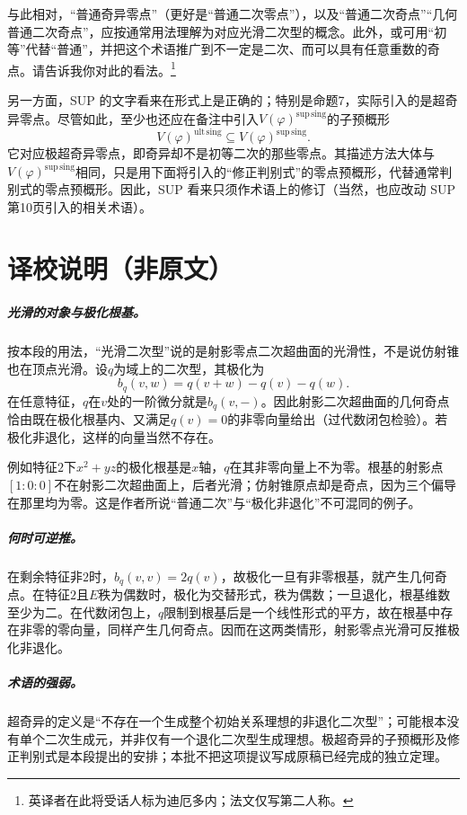 \documentclass[openany,fontset=fandol]{ctexbook}
\begin{document}
与此相对，“普通奇异零点”（更好是“普通二次零点”），以及“普通二次奇点”“几何普通二次奇点”，应按通常用法理解为对应光滑二次型的概念。此外，或可用“初等”代替“普通”，并把这个术语推广到不一定是二次、而可以具有任意重数的奇点。请告诉我你对此的看法。\footnote{英译者在此将受话人标为迪厄多内；法文仅写第二人称。}

另一方面，SUP 的文字看来在形式上是正确的；特别是命题7，实际引入的是超奇异零点。尽管如此，至少也还应在备注中引入$V(\varphi)^{\mathrm{sup\,sing}}$的子预概形
\[
V(\varphi)^{\mathrm{ult\,sing}}
\subseteq V(\varphi)^{\mathrm{sup\,sing}}.
\]
它对应极超奇异零点，即奇异却不是初等二次的那些零点。其描述方法大体与$V(\varphi)^{\mathrm{sup\,sing}}$相同，只是用下面将引入的“修正判别式”的零点预概形，代替通常判别式的零点预概形。因此，SUP 看来只须作术语上的修订（当然，也应改动 SUP 第10页引入的相关术语）。
\chapter*{译校说明（非原文）}
\paragraph{光滑的对象与极化根基。}
按本段的用法，“光滑二次型”说的是射影零点二次超曲面的光滑性，不是说仿射锥也在顶点光滑。设$q$为域上的二次型，其极化为
\[
b_q(v,w)=q(v+w)-q(v)-q(w).
\]
在任意特征，$q$在$v$处的一阶微分就是$b_q(v,-)$。因此射影二次超曲面的几何奇点恰由既在极化根基内、又满足$q(v)=0$的非零向量给出（过代数闭包检验）。若极化非退化，这样的向量当然不存在。

例如特征$2$下$x^2+yz$的极化根基是$x$轴，$q$在其非零向量上不为零。根基的射影点$[1:0:0]$不在射影二次超曲面上，后者光滑；仿射锥原点却是奇点，因为三个偏导在那里均为零。这是作者所说“普通二次”与“极化非退化”不可混同的例子。

\paragraph{何时可逆推。}
在剩余特征非$2$时，$b_q(v,v)=2q(v)$，故极化一旦有非零根基，就产生几何奇点。在特征$2$且$E$秩为偶数时，极化为交替形式，秩为偶数；一旦退化，根基维数至少为二。在代数闭包上，$q$限制到根基后是一个线性形式的平方，故在根基中存在非零的零向量，同样产生几何奇点。因而在这两类情形，射影零点光滑可反推极化非退化。

\paragraph{术语的强弱。}
超奇异的定义是“不存在一个生成整个初始关系理想的非退化二次型”；可能根本没有单个二次生成元，并非仅有一个退化二次型生成理想。极超奇异的子预概形及修正判别式是本段提出的安排；本批不把这项提议写成原稿已经完成的独立定理。
\end{document}
